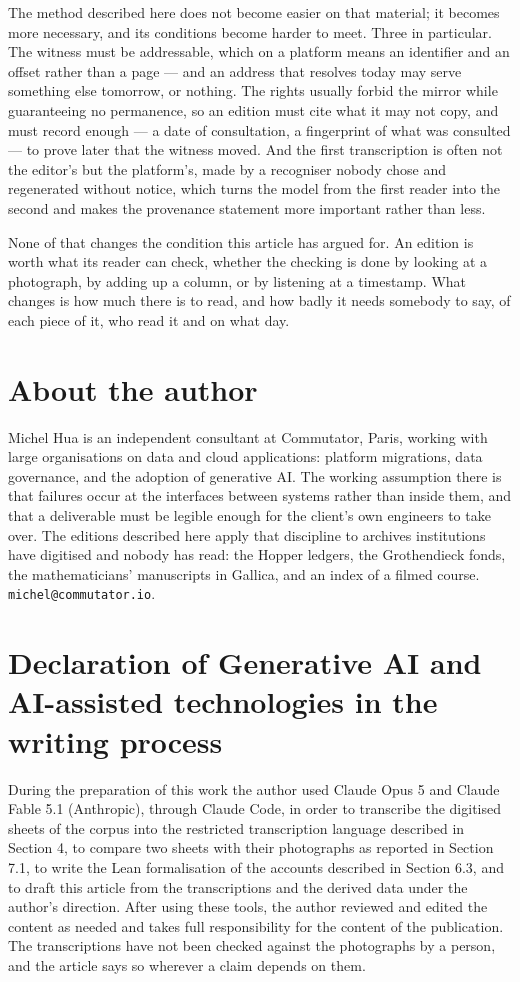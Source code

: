 \documentclass[11pt]{article}
\begin{document}
The method described here does not become easier on that material; it becomes
more necessary, and its conditions become harder to meet. Three in particular.
The witness must be addressable, which on a platform means an identifier and an
offset rather than a page --- and an address that resolves today may serve
something else tomorrow, or nothing. The rights usually forbid the mirror while
guaranteeing no permanence, so an edition must cite what it may not copy, and
must record enough --- a date of consultation, a fingerprint of what was
consulted --- to prove later that the witness moved. And the first transcription
is often not the editor's but the platform's, made by a recogniser nobody chose
and regenerated without notice, which turns the model from the first reader into
the second and makes the provenance statement more important rather than less.

None of that changes the condition this article has argued for. An edition is
worth what its reader can check, whether the checking is done by looking at a
photograph, by adding up a column, or by listening at a timestamp. What changes
is how much there is to read, and how badly it needs somebody to say, of each
piece of it, who read it and on what day.

\section*{About the author}

Michel Hua is an independent consultant at Commutator, Paris, working with
large organisations on data and cloud applications: platform migrations, data
governance, and the adoption of generative AI. The working assumption there is
that failures occur at the interfaces between systems rather than inside them,
and that a deliverable must be legible enough for the client's own engineers to
take over. The editions described here apply that discipline to archives
institutions have digitised and nobody has read: the Hopper ledgers, the
Grothendieck fonds, the mathematicians' manuscripts in Gallica, and an index
of a filmed course. \texttt{michel@commutator.io}.

\section*{Declaration of Generative AI and AI-assisted technologies in the writing process}

During the preparation of this work the author used Claude Opus 5 and Claude Fable 5.1 (Anthropic), through Claude Code, in order to transcribe the digitised sheets of the corpus into the restricted transcription language described in Section 4, to compare two sheets with their photographs as reported in Section 7.1, to write the Lean formalisation of the accounts described in Section 6.3, and to draft this article from the transcriptions and the derived data under the author's direction. After using these tools, the author reviewed and edited the content as needed and takes full responsibility for the content of the publication. The transcriptions have not been checked against the photographs by a person, and the article says so wherever a claim depends on them.
\end{document}
